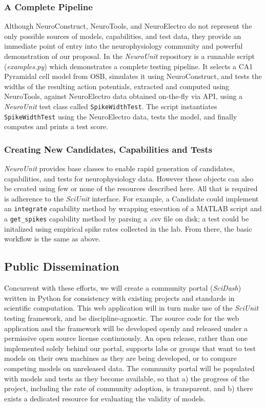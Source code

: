 \documentclass[11pt,letterpaper]{article}
\begin{document}
\subsubsection{A Complete Pipeline}
Although NeuroConstruct, NeuroTools, and NeuroElectro do not represent the only possible sources of models, capabilities, and test data, they provide an immediate point of entry into the neurophysiology community and powerful demonstration of our proposal.  In the \textit{NeuroUnit} repository \cite{neurounit_url} is a runnable script (\textit{examples.py}) which demonstrates a complete testing pipeline.  It selects a CA1 Pyramidal cell model from OSB, simulates it using NeuroConstruct, and tests the widths of the resulting action potentials, extracted and computed using NeuroTools, against NeuroElectro data obtained on-the-fly via API, using a \textit{NeuroUnit} test class called \verb|SpikeWidthTest|.  The script instantiates \verb|SpikeWidthTest| using the NeuroElectro data, tests the model, and finally computes and prints a test score.    

\subsubsection{Creating New Candidates, Capabilities and Tests}
\textit{NeuroUnit} provides base classes to enable rapid generation of candidates, capabilities, and tests for neurophysiology data.  However these objects can also be created using few or none of the resources described here.  All that is required is adherence to the \textit{SciUnit} interface.  For example, a Candidate could implement an \verb|integrate| capability method by wrapping execution of a MATLAB script and a \verb|get_spikes| capability method by parsing a .csv file on disk; a test could be initalized using empirical spike rates collected in the lab. From there, the basic workflow is the same as above. 

\subsection{Public Dissemination}
Concurrent with these efforts, we will create a community portal (\textit{SciDash}) written in Python for consistency with existing projects and standards in scientific computation.  This web application will in turn make use of the \textit{SciUnit} testing framework, and be discipline-agnostic.  The source code for the web application and the framework will be developed openly and released under a permissive open source license continuously. An open release, rather than one implemented solely behind our portal, supports labs or groups that want to test models on their own machines as they are being developed, or to compare competing models on unreleased data.  The community portal will be populated with models and tests as they become available, so that a) the progress of the project, including the rate of community adoption, is transparent, and b) there exists a dedicated resource for evaluating the validity of models.  
\end{document}
